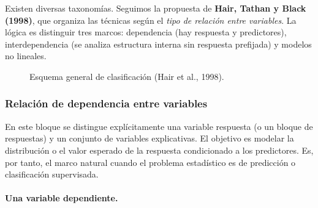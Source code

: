 \documentclass[12pt, a4paper]{article}
\theoremstyle{plain}
\theoremstyle{definition}
\theoremstyle{remark}
\begin{document}
Existen diversas taxonomías. Seguimos la propuesta de \textbf{Hair, Tathan y
Black (1998)}, que organiza las técnicas según el \emph{tipo de relación entre
variables}. La lógica es distinguir tres marcos: dependencia (hay respuesta y
predictores), interdependencia (se analiza estructura interna sin respuesta
prefijada) y modelos no lineales.

\begin{figure}[H]
  \centering
  \caption{Esquema general de clasificación (Hair et al., 1998).}
\end{figure}

\subsubsection{Relación de dependencia entre variables}

En este bloque se distingue explícitamente una variable respuesta (o un bloque
de respuestas) y un conjunto de variables explicativas. El objetivo es modelar
la distribución o el valor esperado de la respuesta condicionado a los
predictores. Es, por tanto, el marco natural cuando el problema estadístico es
de predicción o clasificación supervisada.

\paragraph{Una variable dependiente.}
\end{document}
